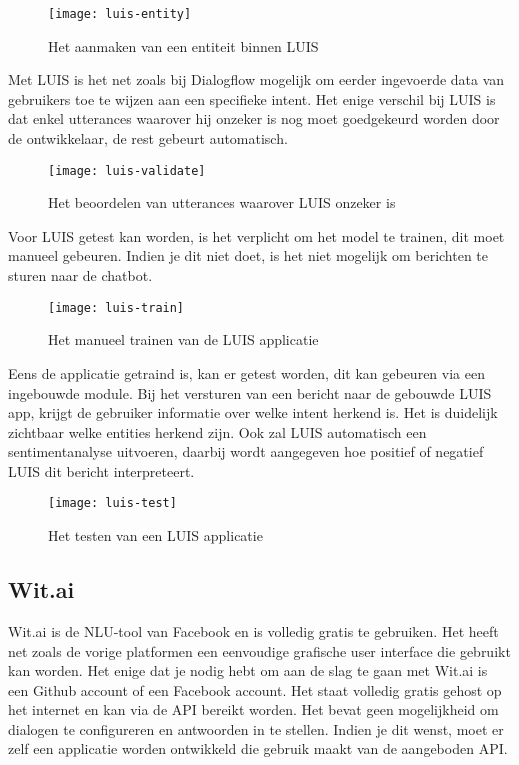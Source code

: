 \begin{figure}[H]
    \label{fig:luis-entity}
    \centering
    \texttt{[image: luis-entity]}
    \caption{Het aanmaken van een entiteit binnen LUIS}
\end{figure}

Met LUIS is het net zoals bij Dialogflow mogelijk om eerder ingevoerde data van gebruikers toe te wijzen aan een specifieke intent. Het enige verschil bij LUIS is dat enkel utterances waarover hij onzeker is nog moet goedgekeurd worden door de ontwikkelaar, de rest gebeurt automatisch.

\begin{figure}[H]
    \label{fig:luis-validate}
    \centering
    \texttt{[image: luis-validate]}
    \caption{Het beoordelen van utterances waarover LUIS onzeker is}
\end{figure}

Voor LUIS getest kan worden, is het verplicht om het model te trainen, dit moet manueel gebeuren. Indien je dit niet doet, is het niet mogelijk om berichten te sturen naar de chatbot.

\begin{figure}[H]
    \label{fig:luis-train}
    \centering
    \texttt{[image: luis-train]}
    \caption{Het manueel trainen van de LUIS applicatie}
\end{figure}

Eens de applicatie getraind is, kan er getest worden, dit kan gebeuren via een ingebouwde module. Bij het versturen van een bericht naar de gebouwde LUIS app, krijgt de gebruiker informatie over welke intent herkend is.
Het is duidelijk zichtbaar welke entities herkend zijn. Ook zal LUIS automatisch een sentimentanalyse uitvoeren, daarbij wordt aangegeven hoe positief of negatief LUIS dit bericht interpreteert.

\begin{figure}[H]
    \label{fig:luis-test}
    \centering
    \texttt{[image: luis-test]}
    \caption{Het testen van een LUIS applicatie}
\end{figure}

\subsection{Wit.ai}
\label{subsec:werking-platformen-wit}

Wit.ai is de NLU-tool van Facebook en is volledig gratis te gebruiken. Het heeft net zoals de vorige platformen een eenvoudige grafische user interface die gebruikt kan worden. Het enige dat je nodig hebt om aan de slag te gaan met Wit.ai is een Github account of een Facebook account. Het staat volledig gratis gehost op het internet en kan via de API bereikt worden. Het bevat geen mogelijkheid om dialogen te configureren en antwoorden in te stellen. Indien je dit wenst, moet er zelf een applicatie worden ontwikkeld die gebruik maakt van de aangeboden API.

